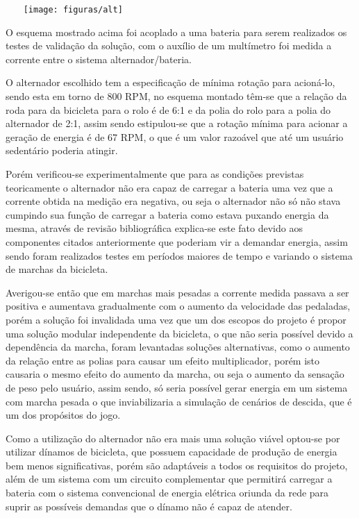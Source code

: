 \begin{center}
    \texttt{[image: figuras/alt]}
       \label{alt}
   \end{center}

O esquema mostrado acima foi acoplado a uma bateria para serem realizados os testes de validação da solução, com o auxílio de um multímetro foi medida a corrente entre o sistema alternador/bateria. 

O alternador escolhido tem a especificação de mínima rotação para acioná-lo, sendo esta em torno de 800 RPM, no esquema montado têm-se que a relação da roda para da bicicleta para o rolo é de 6:1 e da polia do rolo para a polia do alternador de 2:1, assim sendo estipulou-se que a rotação mínima para acionar a geração de energia é de 67 RPM, o que é um valor razoável que até um usuário sedentário poderia atingir. 

Porém verificou-se experimentalmente que para as condições previstas teoricamente o alternador não era capaz de carregar a bateria uma vez que a corrente obtida na medição era negativa, ou seja o alternador não só não stava cumpindo sua função de carregar a bateria como estava puxando energia da mesma, através de revisão bibliográfica explica-se este fato devido aos componentes citados anteriormente que poderiam vir a demandar energia, assim sendo foram realizados testes em períodos maiores de tempo e variando o sistema de marchas da bicicleta. 

Averigou-se então que em marchas mais pesadas a corrente medida passava a ser positiva e aumentava gradualmente com o aumento da velocidade das pedaladas, porém a solução foi invalidada uma vez que um dos escopos do projeto é propor uma solução modular independente da bicicleta, o que não seria possível devido a dependência da marcha, foram levantadas soluções alternativas, como o aumento da relação entre as polias para causar um efeito multiplicador, porém isto causaria o mesmo efeito do aumento da marcha, ou seja o aumento da sensação de peso pelo usuário, assim sendo, só seria possível gerar energia em um sistema com marcha pesada o que inviabilizaria a simulação de cenários de descida, que é um dos propósitos do jogo. 

Como a utilização do alternador não era mais uma solução viável optou-se por utilizar dínamos de bicicleta, que possuem capacidade de produção de energia bem menos significativas, porém são adaptáveis a todos os requisitos do projeto, além de um sistema com um circuito complementar que permitirá carregar a bateria com o sistema convencional de energia elétrica oriunda da rede para suprir as possíveis demandas que o dínamo não é capaz de atender.

